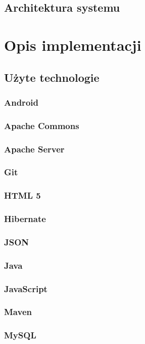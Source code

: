 \documentclass[11pt,a4paper,polish,thesis]{dcsbook}
\begin{document}
\section{Architektura systemu}


\chapter{Opis implementacji}
\section{Użyte technologie}
\subsection{Android}
\subsection{Apache Commons}
\subsection{Apache Server}
\subsection{Git}
\subsection{HTML 5}
\subsection{Hibernate}
\subsection{JSON}
\subsection{Java}
\subsection{JavaScript}
\subsection{Maven}
\subsection{MySQL}
\end{document}
